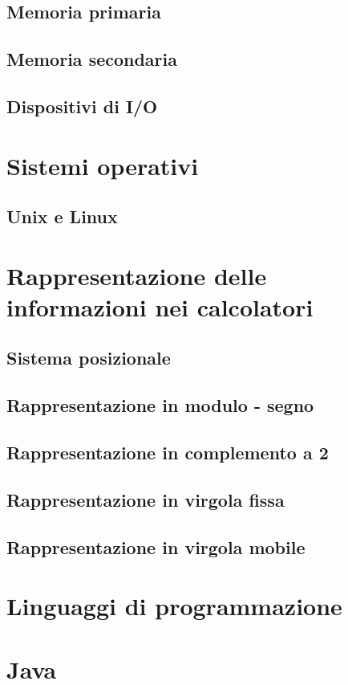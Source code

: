 \documentclass{article}
\begin{document}
\subsection{Memoria primaria}
\subsection{Memoria secondaria}
\subsection{Dispositivi di I/O}


\section{Sistemi operativi}
\subsection{Unix e Linux}


\section{Rappresentazione delle informazioni nei calcolatori}
\subsection{Sistema posizionale}
\subsection{Rappresentazione in modulo - segno}
\subsection{Rappresentazione in complemento a 2}
\subsection{Rappresentazione in virgola fissa}
\subsection{Rappresentazione in virgola mobile}

\section{Linguaggi di programmazione}

\section{Java}
\end{document}
